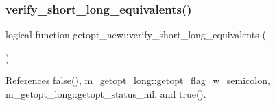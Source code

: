 \mbox{\label{M__getopt__long_8f90_aa269c37cf5c19077d40736e1d0557e3d}} 
\subsubsection{\texorpdfstring{verify\+\_\+short\+\_\+long\+\_\+equivalents()}{verify\_short\_long\_equivalents()}}
{\footnotesize\ttfamily logical function getopt\+\_\+new\+::verify\+\_\+short\+\_\+long\+\_\+equivalents (\begin{DoxyParamCaption}{ }\end{DoxyParamCaption})}



References false(), m\+\_\+getopt\+\_\+long\+::getopt\+\_\+flag\+\_\+w\+\_\+semicolon, m\+\_\+getopt\+\_\+long\+::getopt\+\_\+status\+\_\+nil, and true().

